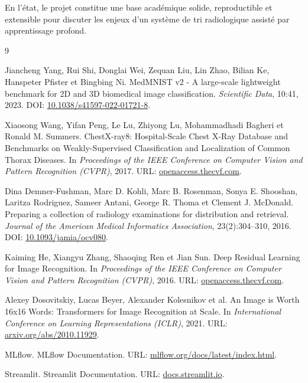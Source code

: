 \documentclass[11pt,a4paper]{article}
\begin{document}
En l'\'etat, le projet constitue une base acad\'emique solide, reproductible et extensible pour discuter les enjeux d'un syst\`eme de tri radiologique assist\'e par apprentissage profond.

\clearpage
\begin{thebibliography}{9}

Jiancheng Yang, Rui Shi, Donglai Wei, Zequan Liu, Lin Zhao, Bilian Ke, Hanspeter Pfister et Bingbing Ni.
\newblock MedMNIST v2 - A large-scale lightweight benchmark for 2D and 3D biomedical image classification.
\newblock \emph{Scientific Data}, 10:41, 2023.
\newblock DOI: \href{https://doi.org/10.1038/s41597-022-01721-8}{10.1038/s41597-022-01721-8}.

Xiaosong Wang, Yifan Peng, Le Lu, Zhiyong Lu, Mohammadhadi Bagheri et Ronald M. Summers.
\newblock ChestX-ray8: Hospital-Scale Chest X-Ray Database and Benchmarks on Weakly-Supervised Classification and Localization of Common Thorax Diseases.
\newblock In \emph{Proceedings of the IEEE Conference on Computer Vision and Pattern Recognition (CVPR)}, 2017.
\newblock URL: \href{https://openaccess.thecvf.com/content_cvpr_2017/papers/Wang_ChestX-ray8_Hospital-Scale_Chest_CVPR_2017_paper.pdf}{openaccess.thecvf.com}.

Dina Demner-Fushman, Marc D. Kohli, Marc B. Rosenman, Sonya E. Shooshan, Laritza Rodriguez, Sameer Antani, George R. Thoma et Clement J. McDonald.
\newblock Preparing a collection of radiology examinations for distribution and retrieval.
\newblock \emph{Journal of the American Medical Informatics Association}, 23(2):304--310, 2016.
\newblock DOI: \href{https://doi.org/10.1093/jamia/ocv080}{10.1093/jamia/ocv080}.

Kaiming He, Xiangyu Zhang, Shaoqing Ren et Jian Sun.
\newblock Deep Residual Learning for Image Recognition.
\newblock In \emph{Proceedings of the IEEE Conference on Computer Vision and Pattern Recognition (CVPR)}, 2016.
\newblock URL: \href{https://openaccess.thecvf.com/content_cvpr_2016/html/He_Deep_Residual_Learning_CVPR_2016_paper.html}{openaccess.thecvf.com}.

Alexey Dosovitskiy, Lucas Beyer, Alexander Kolesnikov et al.
\newblock An Image is Worth 16x16 Words: Transformers for Image Recognition at Scale.
\newblock In \emph{International Conference on Learning Representations (ICLR)}, 2021.
\newblock URL: \href{https://arxiv.org/abs/2010.11929}{arxiv.org/abs/2010.11929}.

MLflow.
\newblock MLflow Documentation.
\newblock URL: \href{https://mlflow.org/docs/latest/index.html}{mlflow.org/docs/latest/index.html}.

Streamlit.
\newblock Streamlit Documentation.
\newblock URL: \href{https://docs.streamlit.io/}{docs.streamlit.io}.

\end{thebibliography}
\end{document}
